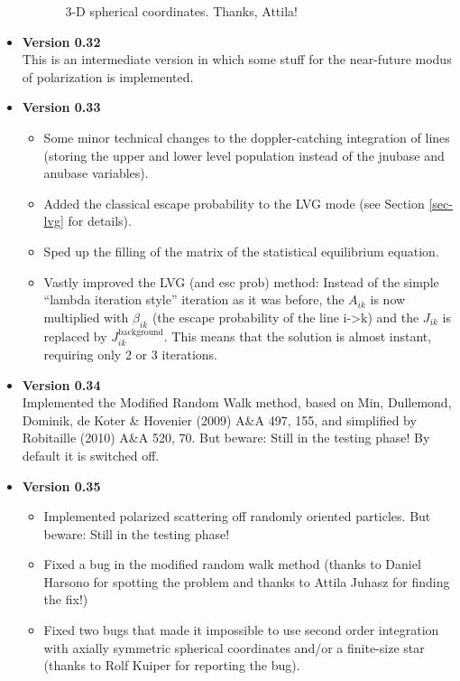 \documentclass{report}
\begin{document}
\begin{itemize}
\begin{itemize}
\begin{itemize}
      3-D spherical coordinates. Thanks, Attila!
    \end{itemize}
  \end{itemize}
\item {\bf Version 0.32}\\
This is an intermediate version in which some stuff for the near-future
modus of polarization is implemented.
\item {\bf Version 0.33}
  \begin{itemize}
  \item Some minor technical changes to the doppler-catching integration of
    lines (storing the upper and lower level population instead of the
    jnubase and anubase variables). 
  \item Added the classical escape probability to the LVG mode (see Section
    \ref{sec-lvg} for details).
  \item Sped up the filling of the matrix of the statistical equilibrium
    equation.
  \item Vastly improved the LVG (and esc prob) method: Instead of the simple
    ``lambda iteration style'' iteration as it was before, the $A_{ik}$ is
    now multiplied with $\beta_{ik}$ (the escape probability of the line
    i->k) and the $J_{ik}$ is replaced by
    $J_{ik}^{\mathrm{background}}$. This means that the solution is almost
    instant, requiring only 2 or 3 iterations.
  \end{itemize}
\item {\bf Version 0.34}\\
  Implemented the Modified Random Walk method, based on Min, Dullemond,
  Dominik, de Koter \& Hovenier (2009) A\&A 497, 155, and simplified by
  Robitaille (2010) A\&A 520, 70. But beware: Still in the testing
  phase! By default it is switched off. 
\item {\bf Version 0.35}\\
  \begin{itemize}
  \item Implemented polarized scattering off randomly oriented
    particles. But beware: Still in the testing phase!
  \item Fixed a bug in the modified random walk method (thanks to Daniel
    Harsono for spotting the problem and thanks to Attila Juhasz for
    finding the fix!)
  \item Fixed two bugs that made it impossible to use second order
    integration with axially symmetric spherical coordinates and/or
    a finite-size star (thanks to Rolf Kuiper for reporting the bug). 

\end{itemize}
\end{itemize}
\end{document}
